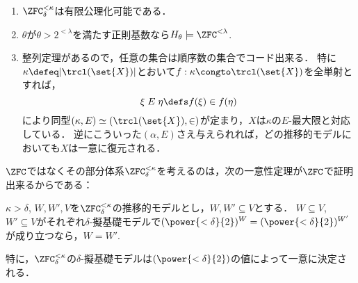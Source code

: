 \documentclass[a4j,leqno]{ltjsarticle}
\theoremstyle{nonumberplain}
\begin{document}
\begin{remark}
 \begin{enumerate}
  \item $\ZFC^{<\kappa}_\delta$は有限公理化可能である．
  \item $\theta$が$\theta > 2^{<\lambda}$を満たす正則基数なら$H_\theta \models \ZFC^{<\lambda}$.
  \item 整列定理があるので，任意の集合は順序数の集合でコード出来る．
        特に$\kappa \defeq |\trcl(\set{X})|$とおいて$f: \kappa \congto \trcl(\set{X})$を全単射とすれば，
        \[
         \xi \mathrel{E} \eta \defs f(\xi) \in f(\eta)
        \]
        により同型$(\kappa, E) \simeq (\trcl(\set{X}), {\in})$が定まり，$X$は$\kappa$の$E$-最大限と対応している．
        逆にこういった$(\alpha, E)$さえ与えられれば，どの推移的モデルにおいても$X$は一意に復元される．
 \end{enumerate}
\end{remark}
$\ZFC$ではなくその部分体系$\ZFC^{<\kappa}_\delta$を考えるのは，次の一意性定理が$\ZFC$で証明出来るからである：
\begin{theorem}\label{thm:2-d-determ-pg}
 $\kappa > \delta$, $W, W', V$を$\ZFC^{<\kappa}_\delta$の推移的モデルとし，$W, W' \subseteq V$とする．
 $W \subseteq V$, $W' \subseteq V$がそれぞれ$\delta$-擬基礎モデルで$(\power{<\delta}{2})^W = (\power{<\delta}{2})^{W'}$が成り立つなら，$W = W'$.
 
 特に，$\ZFC^{<\kappa}_\delta$の$\delta$-擬基礎モデルは$(\power{<\delta}{2})$の値によって一意に決定される．
\end{theorem}
\end{document}
